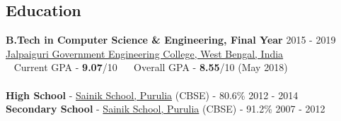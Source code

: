 \documentclass[margin, centered, a4paper]{res}
\begin{document}
\begin{resume}

\section{Education}
\textbf{B.Tech in Computer Science \& Engineering, Final Year} \hfill 2015 - 2019 \\
\href{http://jgec.ac.in/}{Jalpaiguri Government Engineering College, West Bengal, India} \\
\hspace*{0.6em}\textbullet~ Current GPA - \textbf{9.07}/10 ~\textbullet~ Overall GPA - \textbf{8.55}/10 (May 2018)
\\
\\
\textbf{High School} - \href{http://sainikschoolpurulia.com/}{Sainik School, Purulia} (CBSE) - 80.6\% \hfill 2012 - 2014 \\
\textbf{Secondary School} - \href{http://sainikschoolpurulia.com/}{Sainik School, Purulia} (CBSE) - 91.2\% \hfill 2007 - 2012
 

\end{resume}
\end{document}
